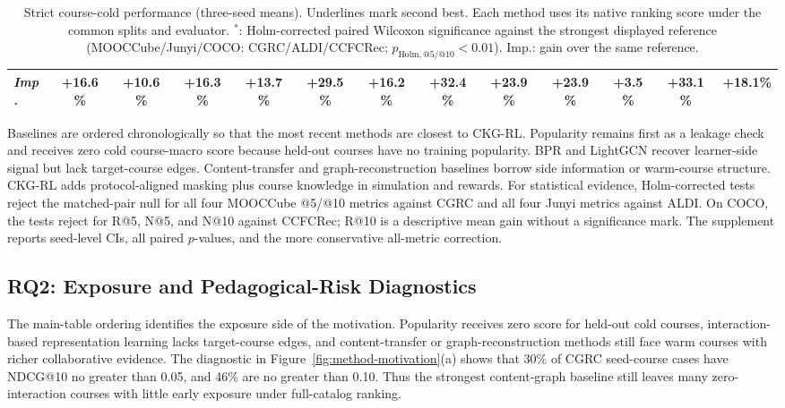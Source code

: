 \documentclass[letterpaper]{article}
\begin{document}
\begin{table}[t]
{\begin{tabular}{lcccccccccccc}
\emph{Imp.} & +16.6\% & +10.6\% & +16.3\% & +13.7\% & +29.5\% & +16.2\% & +32.4\% & +23.9\% & +23.9\% & +3.5\% & +33.1\% & +18.1\% \\
\bottomrule
\end{tabular}
}
\caption{Strict course-cold performance (three-seed means). Underlines mark second best. Each method uses its native ranking score under the common splits and evaluator. \(^{*}\): Holm-corrected paired Wilcoxon significance against the strongest displayed reference (MOOCCube/Junyi/COCO: CGRC/ALDI/CCFCRec; \(p_{\mathrm{Holm,@5/@10}}<0.01\)). Imp.: gain over the same reference.}
\label{tab:main-cold-results}
\end{table}

Baselines are ordered chronologically so that the most recent methods are closest to CKG-RL. Popularity remains first as a leakage check and receives zero cold course-macro score because held-out courses have no training popularity. BPR and LightGCN recover learner-side signal but lack target-course edges. Content-transfer and graph-reconstruction baselines borrow side information or warm-course structure. CKG-RL adds protocol-aligned masking plus course knowledge in simulation and rewards. For statistical evidence, Holm-corrected tests reject the matched-pair null for all four MOOCCube @5/@10 metrics against CGRC and all four Junyi metrics against ALDI. On COCO, the tests reject for R@5, N@5, and N@10 against CCFCRec; R@10 is a descriptive mean gain without a significance mark. The supplement reports seed-level CIs, all paired \(p\)-values, and the more conservative all-metric correction.

\subsection{RQ2: Exposure and Pedagogical-Risk Diagnostics}
The main-table ordering identifies the exposure side of the motivation. Popularity receives zero score for held-out cold courses, interaction-based representation learning lacks target-course edges, and content-transfer or graph-reconstruction methods still face warm courses with richer collaborative evidence. The diagnostic in Figure~\ref{fig:method-motivation}(a) shows that 30\% of CGRC seed-course cases have NDCG@10 no greater than 0.05, and 46\% are no greater than 0.10. Thus the strongest content-graph baseline still leaves many zero-interaction courses with little early exposure under full-catalog ranking.
\end{document}
